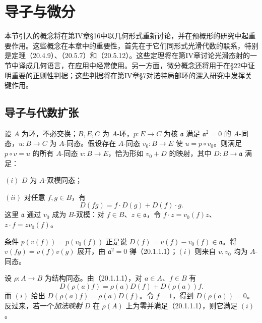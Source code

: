 \section{导子与微分}
本节引入的概念将在第IV章§16中以几何形式重新讨论，并在预概形的研究中起重要作用。这些概念在本章中的重要性，首先在于它们同形式光滑代数的联系，特别是定理（20.4.9）、（20.5.7）和（20.5.12）。这些定理将在第IV章讨论光滑态射的一节中译成几何语言，在应用中经常使用。另一方面，微分概念还将用于在§22中证明重要的正则性判据；这些判据将在第IV章§7对诺特局部环的深入研究中发挥关键作用。

\subsection{导子与代数扩张}
设 $A$ 为环，不必交换；$B,E,C$ 为 $A$-环，$p:E\to C$ 为核 $\mathfrak a$ 满足 $\mathfrak a^2=0$ 的 $A$-同态，$u:B\to C$ 为 $A$-同态。假设存在 $A$-同态 $v_0:B\to E$ 使 $u=p\circ v_0$。则满足 $p\circ v=u$ 的所有 $A$-同态 $v:B\to E$，恰为形如 $v_0+D$ 的映射，其中 $D:B\to\mathfrak a$ 满足：

$(i)$ $D$ 为 $A$-双模同态；

$(ii)$ 对任意 $f,g\in B$，有
\begin{equation}
 D(fg)=f\cdot D(g)+D(f)\cdot g.
 \tag{20.1.1.1}
\end{equation}
这里 $\mathfrak a$ 通过 $v_0$ 成为 $B$-双模：对 $f\in B$、$z\in\mathfrak a$，令 $f\cdot z=v_0(f)z$、$z\cdot f=zv_0(f)$。

条件 $p(v(f))=p(v_0(f))$ 正是说 $D(f)=v(f)-v_0(f)\in\mathfrak a$。将 $v(fg)=v(f)v(g)$ 展开，由 $\mathfrak a^2=0$ 得（20.1.1.1）；$(i)$ 则来自 $v,v_0$ 均为 $A$-同态。

设 $\rho:A\to B$ 为结构同态。由（20.1.1.1），对 $a\in A$、$f\in B$ 有
\[
 D(\rho(a)f)=\rho(a)D(f)+D(\rho(a))f.
\]
而 $(i)$ 给出 $D(\rho(a)f)=\rho(a)D(f)$。令 $f=1$，得到 $D(\rho(a))=0$。反过来，若一个\emph{加法映射} $D$ 在 $\rho(A)$ 上为零并满足（20.1.1.1），则它满足 $(i)$。

